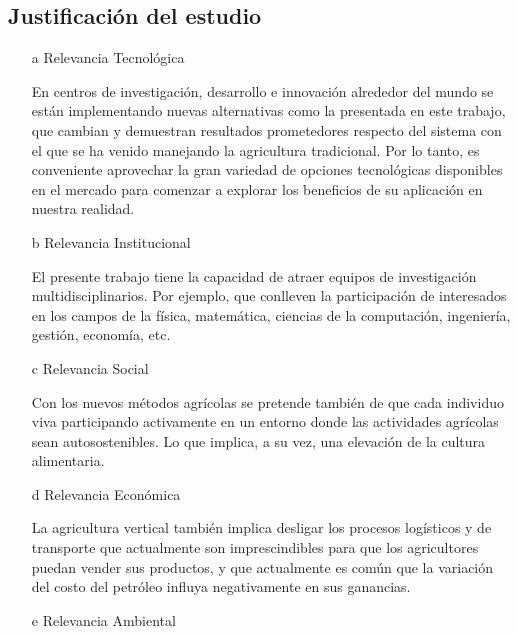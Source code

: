 \documentclass{report}
\begin{document}
\subsection{Justificación del estudio}
\begin{enumerate}
\item[a] Relevancia Tecnológica
  
  En centros de investigación, desarrollo e innovación alrededor del
  mundo se están implementando nuevas alternativas como la presentada en este
  trabajo, que cambian y demuestran resultados prometedores respecto del sistema
  con el que se ha venido manejando la agricultura tradicional. Por lo tanto, es
  conveniente aprovechar la gran variedad de opciones tecnológicas disponibles
  en el mercado para comenzar a explorar los beneficios de su aplicación en
  nuestra realidad.
  
\item[b] Relevancia Institucional
  
  El presente trabajo tiene la capacidad de atraer equipos de investigación
  multidisciplinarios. Por ejemplo, que conlleven la participación de
  interesados en los campos de la física, matemática, ciencias de la
  computación, ingeniería, gestión, economía, etc.
  
\item[c] Relevancia Social
  
  Con los nuevos métodos agrícolas se pretende también de que cada individuo
  viva participando activamente en un entorno donde las actividades agrícolas
  sean autosostenibles. Lo que implica, a su vez, una elevación de la cultura
  alimentaria.
  
\item[d] Relevancia Económica
  
  La agricultura vertical también implica desligar los procesos logísticos y de
  transporte que actualmente son imprescindibles para que los agricultores
  puedan vender sus productos, y que actualmente es común que la variación del
  costo del petróleo influya negativamente en sus ganancias.
  
\item[e] Relevancia Ambiental
  

\end{enumerate}
\end{document}
